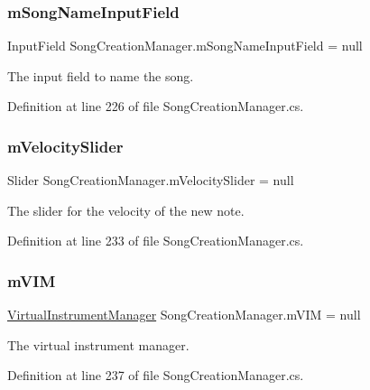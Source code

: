 \mbox{\label{group___s_c_m_priv_var_ga0dd175c73748d5cc8ba4621f36126255}} 
\subsubsection{\texorpdfstring{m\+Song\+Name\+Input\+Field}{mSongNameInputField}}
{\footnotesize\ttfamily Input\+Field Song\+Creation\+Manager.\+m\+Song\+Name\+Input\+Field = null\hspace{0.3cm}{\ttfamily [private]}}



The input field to name the song. 



Definition at line 226 of file Song\+Creation\+Manager.\+cs.

\mbox{\label{group___s_c_m_priv_var_ga7316e5e8f15d1574fc6cb4bd739bbf0a}} 
\subsubsection{\texorpdfstring{m\+Velocity\+Slider}{mVelocitySlider}}
{\footnotesize\ttfamily Slider Song\+Creation\+Manager.\+m\+Velocity\+Slider = null\hspace{0.3cm}{\ttfamily [private]}}



The slider for the velocity of the new note. 



Definition at line 233 of file Song\+Creation\+Manager.\+cs.

\mbox{\label{group___s_c_m_priv_var_ga7822ac42d20a4577db66808f000decfb}} 
\subsubsection{\texorpdfstring{m\+V\+IM}{mVIM}}
{\footnotesize\ttfamily \hyperlink{class_virtual_instrument_manager}{Virtual\+Instrument\+Manager} Song\+Creation\+Manager.\+m\+V\+IM = null\hspace{0.3cm}{\ttfamily [private]}}



The virtual instrument manager. 



Definition at line 237 of file Song\+Creation\+Manager.\+cs.

